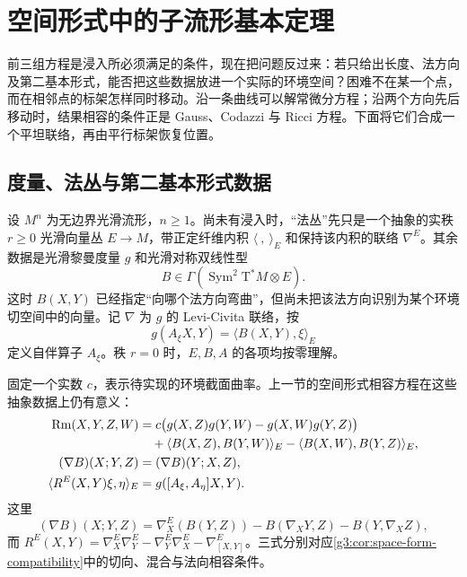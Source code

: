 
% 
% 

\section{空间形式中的子流形基本定理}
\label{g3:sec:0403}

前三组方程是浸入所必须满足的条件，现在把问题反过来：若只给出长度、法方向及第二基本形式，能否把这些数据放进一个实际的环境空间？困难不在某一个点，而在相邻点的标架怎样同时移动。沿一条曲线可以解常微分方程；沿两个方向先后移动时，结果相容的条件正是 Gauss、Codazzi 与 Ricci 方程。下面将它们合成一个平坦联络，再由平行标架恢复位置。

\subsection{度量、法丛与第二基本形式数据}
\label{g3:subsec:0403:01}

设 \(M^n\) 为无边界光滑流形，\(n\geq1\)。尚未有浸入时，“法丛”先只是一个抽象的实秩 \(r\geq0\) 光滑向量丛 \(E\to M\)，带正定纤维内积 \(\langle\ ,\ \rangle_E\) 和保持该内积的联络 \(\nabla^E\)。其余数据是光滑黎曼度量 \(g\) 和光滑对称双线性型
\[
	B\in\Gamma(\operatorname{Sym}^2\mathrm T^*M\otimes E).
\]
这时 \(B(X,Y)\) 已经指定“向哪个法方向弯曲”，但尚未把该法方向识别为某个环境切空间中的向量。记 \(\nabla\) 为 \(g\) 的 Levi-Civita 联络，按
\[
	g(A_\xi X,Y)=\langle B(X,Y),\xi\rangle_E
\]
定义自伴算子 \(A_\xi\)。秩 \(r=0\) 时，\(E,B,A\) 的各项均按零理解。

\ProseParagraphBreak

固定一个实数 \(c\)，表示待实现的环境截面曲率。上一节的空间形式相容方程在这些抽象数据上仍有意义：
\begin{align}
	\mathrm{Rm}(X,Y,Z,W)
	&=c\bigl(g(X,Z)g(Y,W)-g(X,W)g(Y,Z)\bigr)\notag\\
	&\quad+\langle B(X,Z),B(Y,W)\rangle_E
	-\langle B(X,W),B(Y,Z)\rangle_E,\label{g3:eq:abstract-gauss-data}\\
	(\nabla B)(X;Y,Z)&=(\nabla B)(Y;X,Z),\label{g3:eq:abstract-codazzi-data}\\
	\langle R^E(X,Y)\xi,\eta\rangle_E
	&=g([A_\xi,A_\eta]X,Y).\label{g3:eq:abstract-ricci-data}
\end{align}
这里
\[
	(\nabla B)(X;Y,Z)
	=\nabla^E_X(B(Y,Z))-B(\nabla_XY,Z)-B(Y,\nabla_XZ),
\]
而 \(R^E(X,Y)=\nabla^E_X\nabla^E_Y-\nabla^E_Y\nabla^E_X-\nabla^E_{[X,Y]}\)。三式分别对应\cref{g3:cor:space-form-compatibility}中的切向、混合与法向相容条件。

